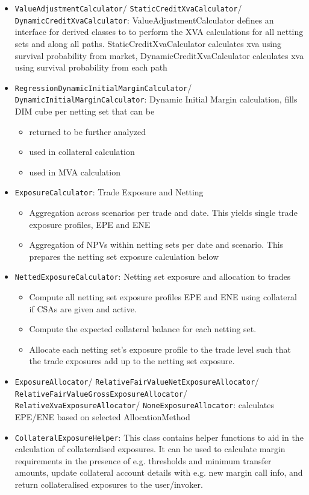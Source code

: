 \documentclass[12pt, a4paper]{article}
\begin{document}
\begin{itemize}
\item {\tt ValueAdjustmentCalculator}/ {\tt StaticCreditXvaCalculator}/ {\tt DynamicCreditXvaCalculator}: ValueAdjustmentCalculator defines an interface for derived classes to to perform the XVA calculations for all netting sets and along all paths. StaticCreditXvaCalculator calculates xva using survival probability from market, DynamicCreditXvaCalculator calculates xva using survival probability from each path
\item {\tt RegressionDynamicInitialMarginCalculator}/ {\tt DynamicInitialMarginCalculator}: Dynamic Initial Margin calculation, fills DIM cube per netting set that can be
\begin{itemize}
\item returned to be further analyzed
\item used in collateral calculation
\item used in MVA calculation
\end{itemize}
\item {\tt ExposureCalculator}: Trade Exposure and Netting
\begin{itemize}
\item Aggregation across scenarios per trade and date. This yields single trade exposure profiles, EPE and ENE
\item Aggregation of NPVs within netting sets per date and scenario. This prepares the netting set exposure calculation below
\end{itemize}
\item {\tt NettedExposureCalculator}: Netting set exposure and allocation to trades
\begin{itemize}
\item Compute all netting set exposure profiles EPE and ENE using collateral if CSAs are given and active.
\item Compute the expected collateral balance for each netting set.
\item Allocate each netting set's exposure profile to the trade level such that the trade exposures add up to the netting set exposure.
\end{itemize}
\item {\tt ExposureAllocator}/ {\tt RelativeFairValueNetExposureAllocator}/ {\tt RelativeFairValueGrossExposureAllocator}/ {\tt RelativeXvaExposureAllocator}/ {\tt NoneExposureAllocator}: calculates EPE/ENE based on selected AllocationMethod
\item {\tt CollateralExposureHelper}: This class contains helper functions to aid in the calculation of collateralised exposures. It can be used to calculate margin requirements in the presence of e.g. thresholds and minimum transfer amounts, update collateral account details with e.g. new margin call info, and return collateralised exposures to the user/invoker.

\end{itemize}
\end{document}
